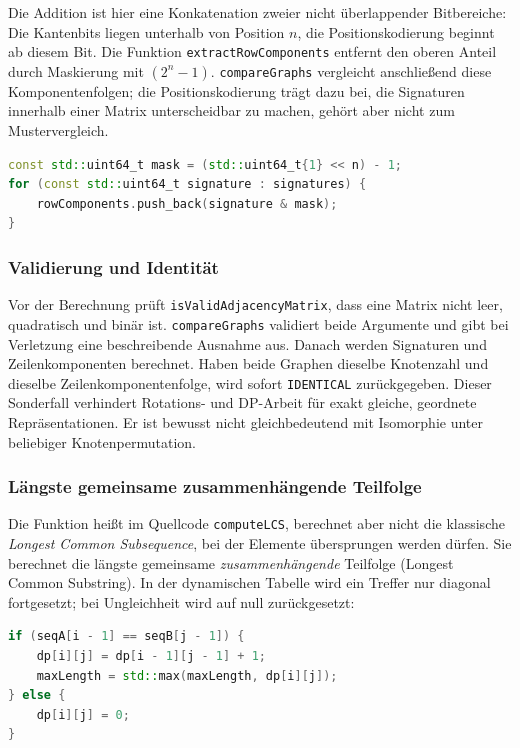 \documentclass[a4paper,12pt, twoside]{report}
\theoremstyle{definition}
\begin{document}
Die Addition ist hier eine Konkatenation zweier nicht überlappender Bitbereiche: Die Kantenbits liegen unterhalb von Position $n$, die Positionskodierung beginnt ab diesem Bit. Die Funktion \texttt{extractRowComponents} entfernt den oberen Anteil durch Maskierung mit $(2^n-1)$. \texttt{compareGraphs} vergleicht anschließend diese Komponentenfolgen; die Positionskodierung trägt dazu bei, die Signaturen innerhalb einer Matrix unterscheidbar zu machen, gehört aber nicht zum Mustervergleich.

\begin{lstlisting}[language=C++, caption={Extraktion der unteren $n$ Bits aus jeder Signatur}]
const std::uint64_t mask = (std::uint64_t{1} << n) - 1;
for (const std::uint64_t signature : signatures) {
    rowComponents.push_back(signature & mask);
}
\end{lstlisting}

\subsubsection*{Validierung und Identität}

Vor der Berechnung prüft \texttt{isValidAdjacencyMatrix}, dass eine Matrix nicht leer, quadratisch und binär ist. \texttt{compareGraphs} validiert beide Argumente und gibt bei Verletzung eine beschreibende Ausnahme aus. Danach werden Signaturen und Zeilenkomponenten berechnet. Haben beide Graphen dieselbe Knotenzahl und dieselbe Zeilenkomponentenfolge, wird sofort \texttt{IDENTICAL} zurückgegeben. Dieser Sonderfall verhindert Rotations- und DP-Arbeit für exakt gleiche, geordnete Repräsentationen. Er ist bewusst nicht gleichbedeutend mit Isomorphie unter beliebiger Knotenpermutation.

\subsubsection*{Längste gemeinsame zusammenhängende Teilfolge}

Die Funktion heißt im Quellcode \texttt{computeLCS}, berechnet aber nicht die klassische \emph{Longest Common Subsequence}, bei der Elemente übersprungen werden dürfen. Sie berechnet die längste gemeinsame \emph{zusammenhängende} Teilfolge (Longest Common Substring). In der dynamischen Tabelle wird ein Treffer nur diagonal fortgesetzt; bei Ungleichheit wird auf null zurückgesetzt:

\begin{lstlisting}[language=C++, caption={Dynamische Programmierung für zusammenhängende Übereinstimmungen}]
if (seqA[i - 1] == seqB[j - 1]) {
    dp[i][j] = dp[i - 1][j - 1] + 1;
    maxLength = std::max(maxLength, dp[i][j]);
} else {
    dp[i][j] = 0;
}
\end{lstlisting}
\end{document}
